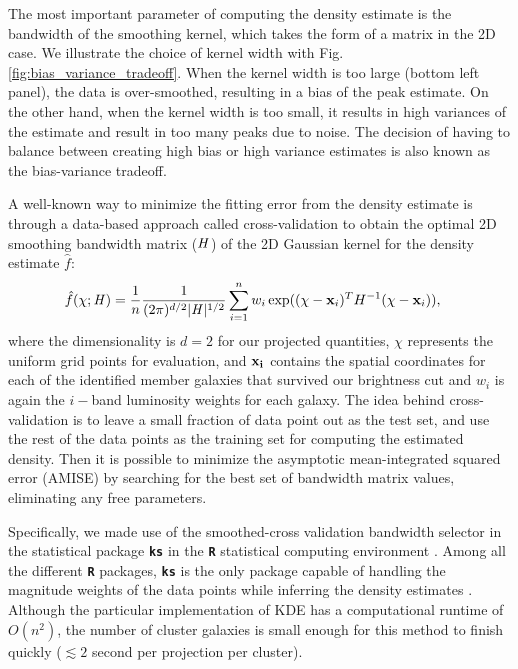 The most important parameter of computing the density estimate is the bandwidth
 of the smoothing kernel, which takes the form of a matrix in the 2D case. 
 We illustrate the choice of kernel width with Fig.
\ref{fig:bias_variance_tradeoff}. When the kernel width is
too large (bottom left panel), the data is over-smoothed, 
resulting in a bias of the peak estimate. On the other hand, when the kernel
width is too small, it results in high variances of the estimate and result in
too many peaks due to noise. The decision of having to balance between creating high
bias or high variance estimates is also known as the bias-variance tradeoff. 

\begin{figure*}
	\caption{This figure is adapted from \citealt{Vanderplas2012} from
\href{http://www.astroml.org/book\_figures/chapter6/fig\_hist\_to\_kernel.html}{http://www.astroml.org/book\_figures/chapter6/fig\_hist\_to\_kernel.html}
under the fair use of the BSD license. \label{fig:bias_variance_tradeoff}
}
\end{figure*}
A well-known way to minimize the fitting error from the density estimate is through
a data-based approach called cross-validation to obtain 
the optimal 2D smoothing
bandwidth matrix ($\mathbf{\it H}$) of the 2D Gaussian kernel for the
density estimate $\hat{f}$:
\begin{align}
	\hat{f}(\chi; \mathbf{\it H}) &= \frac{1}{n} \frac{1}{(2\pi)^{d/2}|\mathbf{\it H}|^{1/2}}
	\sum_{i=1}^n w_i \exp((\chi-{\bf x}_i)^T H^{-1} (\chi-{\bf x}_i)),
	\label{eq:cross_validated_bandwidth}
\end{align}
where the dimensionality is $d=2$ for our projected quantities,
$\chi$ represents the uniform grid points for evaluation, and 
$\bf{x}_i$ contains the spatial coordinates for each of the identified member 
galaxies that survived our brightness cut and $w_i$ is again the $i-$band
luminosity weights for each galaxy.
The idea behind cross-validation is to leave a small fraction of data point 
out as the test set, and use the rest of the data points as 
the training set for computing the estimated density.
Then it is possible to minimize the asymptotic mean-integrated squared error
(AMISE)  by searching
for the best set of bandwidth matrix values, eliminating any free parameters. 

Specifically, we made use of the smoothed-cross validation \citep{Hall1992} 
bandwidth selector in the statistical package {\bf \texttt{ks}} \citep{Duong2007} 
in the {\bf \texttt{R}} statistical computing environment \citep{R_core}. 
Among all the different {\bf \texttt{R}} packages, {\bf \texttt{ks}} is the
only package capable of handling the magnitude weights of the data points 
while inferring the density estimates \citep{Deng2011}. 
Although the particular implementation of KDE has a computational runtime of $O(n^2)$, 
the number of cluster galaxies is
small enough for this method to finish quickly ($\lesssim 2$ second per
projection per cluster). 

